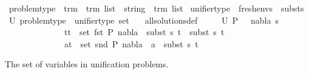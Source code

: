 \begin{isabellebody}
\isamarkupfalse%
\ problem{\isacharunderscore}{\kern0pt}type\ {\isacharequal}{\kern0pt}\ {\isachardoublequoteopen}{\isacharparenleft}{\kern0pt}{\isacharparenleft}{\kern0pt}trm\ {\isasymtimes}\ trm{\isacharparenright}{\kern0pt}\ list{\isacharparenright}{\kern0pt}\ {\isasymtimes}\ {\isacharparenleft}{\kern0pt}{\isacharparenleft}{\kern0pt}string\ {\isasymtimes}\ trm{\isacharparenright}{\kern0pt}\ list{\isacharparenright}{\kern0pt}{\isachardoublequoteclose}\isanewline
\isanewline
{}\isamarkupfalse%
\ unifier{\isacharunderscore}{\kern0pt}type\ {\isacharequal}{\kern0pt}\ {\isachardoublequoteopen}fresh{\isacharunderscore}{\kern0pt}envs\ {\isasymtimes}\ substs{\isachardoublequoteclose}\isanewline
\isanewline
{}\isamarkupfalse%
\ U{\isacharcolon}{\kern0pt}{\isacharcolon}{\kern0pt}\ {\isachardoublequoteopen}problem{\isacharunderscore}{\kern0pt}type\ {\isasymRightarrow}\ {\isacharparenleft}{\kern0pt}unifier{\isacharunderscore}{\kern0pt}type\ set{\isacharparenright}{\kern0pt}{\isachardoublequoteclose}\isanewline
\ \ \ all{\isacharunderscore}{\kern0pt}solutions{\isacharunderscore}{\kern0pt}def{\isacharcolon}{\kern0pt}\ \isanewline
\ \ \ \ {\isachardoublequoteopen}U\ P\ \ {\isasymequiv}\ {\isacharbraceleft}{\kern0pt}{\isacharparenleft}{\kern0pt}nabla{\isacharcomma}{\kern0pt}\ s{\isacharparenright}{\kern0pt}{\isachardot}{\kern0pt}\ \isanewline
\ \ \ \ \ \ \ \ \ \ \ \ \ {\isacharparenleft}{\kern0pt}{\isasymforall}\ {\isacharparenleft}{\kern0pt}t{}{\isacharcomma}{\kern0pt}t{}{\isacharparenright}{\kern0pt}\ {\isasymin}\ set\ {\isacharparenleft}{\kern0pt}fst\ P{\isacharparenright}{\kern0pt}{\isachardot}{\kern0pt}\ nabla\ {\isasymturnstile}\ subst\ s\ t{}\ {\isasymapprox}\ subst\ s\ t{}{\isacharparenright}{\kern0pt}\ {\isasymand}\ \isanewline
\ \ \ \ \ \ \ \ \ \ \ \ \ {\isacharparenleft}{\kern0pt}{\isasymforall}\ {\isacharparenleft}{\kern0pt}a{\isacharcomma}{\kern0pt}t{\isacharparenright}{\kern0pt}\ {\isasymin}\ set\ {\isacharparenleft}{\kern0pt}snd\ P{\isacharparenright}{\kern0pt}{\isachardot}{\kern0pt}\ nabla\ {\isasymturnstile}\ a\ {\isasymsharp}\ subst\ s\ t{\isacharparenright}{\kern0pt}{\isacharbraceright}{\kern0pt}{\isachardoublequoteclose}%
\begin{isamarkuptext}%
The set of variables in unification problems.%
\end{isamarkuptext}\isamarkuptrue%
\isamarkupfalse%

\end{isabellebody}
